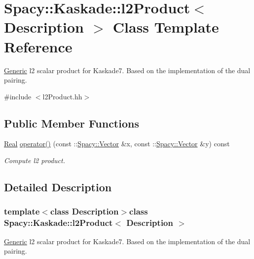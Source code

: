 \hypertarget{classSpacy_1_1Kaskade_1_1l2Product}{\section{\-Spacy\-:\-:\-Kaskade\-:\-:l2\-Product$<$ \-Description $>$ \-Class \-Template \-Reference}
\label{classSpacy_1_1Kaskade_1_1l2Product}
}


\hyperlink{namespaceSpacy_1_1Generic}{\-Generic} l2 scalar product for \-Kaskade7. \-Based on the implementation of the dual pairing.  




{\ttfamily \#include $<$l2\-Product.\-hh$>$}

\subsection*{\-Public \-Member \-Functions}
\begin{DoxyCompactItemize}
\item 
\hyperlink{classSpacy_1_1Real}{\-Real} \hyperlink{classSpacy_1_1Kaskade_1_1l2Product_a22732c1b32cd7eb8a1792440e7298002}{operator()} (const \-::\hyperlink{classSpacy_1_1Vector}{\-Spacy\-::\-Vector} \&x, const \-::\hyperlink{classSpacy_1_1Vector}{\-Spacy\-::\-Vector} \&y) const 
\begin{DoxyCompactList}\small\item\em \-Compute l2 product. \end{DoxyCompactList}\end{DoxyCompactItemize}


\subsection{\-Detailed \-Description}
\subsubsection*{template$<$class Description$>$class Spacy\-::\-Kaskade\-::l2\-Product$<$ Description $>$}

\hyperlink{namespaceSpacy_1_1Generic}{\-Generic} l2 scalar product for \-Kaskade7. \-Based on the implementation of the dual pairing. 

